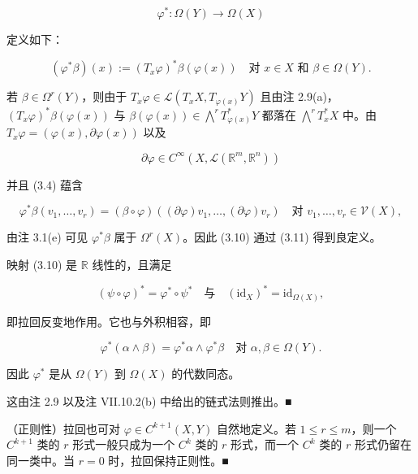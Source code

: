 \begin{equation}
\varphi^{*}: \Omega(Y) \to \Omega(X)\tag{3.10}
\end{equation}

定义如下：

\begin{equation}
(\varphi^{*}\beta)(x) := (T_{x}\varphi)^{*}\beta(\varphi(x)) \quad \text{对 } x \in X \text{ 和 } \beta \in \Omega(Y).\tag{3.11}
\end{equation}

若 $ \beta \in \Omega^{r}(Y) $，则由于 $ T_{x}\varphi \in \mathcal{L}(T_{x}X, T_{\varphi(x)}Y) $ 且由注 2.9(a)，$ (T_{x}\varphi)^{*}\beta(\varphi(x)) $ 与 $ \beta(\varphi(x)) \in \bigwedge^{r}T_{\varphi(x)}^{*}Y $ 都落在 $ \bigwedge^{r}T_{x}^{*}X $ 中。由 $ T_{x}\varphi = (\varphi(x), \partial\varphi(x)) $ 以及

\[
\partial\varphi \in C^{\infty}(X, \mathcal{L}(\mathbb{R}^{m}, \mathbb{R}^{n}))
\]

并且 (3.4) 蕴含

\[
\varphi^{*}\beta(v_{1}, \ldots, v_{r}) = (\beta \circ \varphi)((\partial\varphi)v_{1}, \ldots, (\partial\varphi)v_{r}) \quad \text{对 } v_{1}, \ldots, v_{r} \in \mathcal{V}(X),
\]

由注 3.1(e) 可见 $ \varphi^{*}\beta $ 属于 $ \Omega^{r}(X) $。因此 (3.10) 通过 (3.11) 得到良定义。

\begin{remark}

\begin{items}
\item

映射 (3.10) 是 $ \mathbb{R} $ 线性的，且满足

\[
(\psi \circ \varphi)^{*} = \varphi^{*} \circ \psi^{*} \quad \text{与} \quad (\mathrm{id}_{X})^{*} = \mathrm{id}_{\Omega(X)},
\]

即拉回反变地作用。它也与外积相容，即

\[
\varphi^{*}(\alpha \wedge \beta) = \varphi^{*}\alpha \wedge \varphi^{*}\beta \quad \text{对 } \alpha, \beta \in \Omega(Y).
\]

因此 $ \varphi^{*} $ 是从 $ \Omega(Y) $ 到 $ \Omega(X) $ 的代数同态。

\proofhead
这由注 2.9 以及注 VII.10.2(b) 中给出的链式法则推出。\nobreak\hspace{0.35em}■
\item

（正则性）拉回也可对 $ \varphi \in C^{k+1}(X, Y) $ 自然地定义。若 $ 1 \le r \le m $，则一个 $ C^{k+1} $ 类的 $ r $ 形式一般只成为一个 $ C^{k} $ 类的 $ r $ 形式，而一个 $ C^{k} $ 类的 $ r $ 形式仍留在同一类中。当 $ r = 0 $ 时，拉回保持正则性。\nobreak\hspace{0.35em}■

\end{items}

\end{remark}

